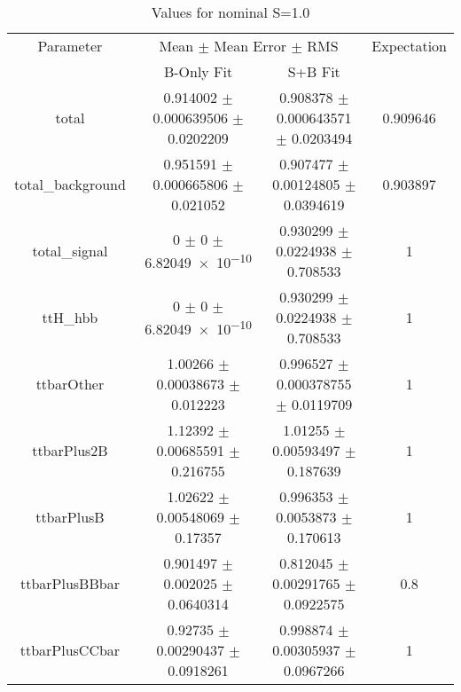 \begin{table}
\centering
\caption{Values for nominal S=1.0}
\begin{tabular}{cccc}
\toprule
Parameter & \multicolumn{2}{c}{Mean $\pm$ Mean Error $\pm$ RMS} & Expectation\\
 & B-Only Fit & S+B Fit & \\
\midrule
total & \num{0.914002} $\pm$ \num{0.000639506} $\pm$ \num{0.0202209} & \num{0.908378} $\pm$ \num{0.000643571} $\pm$ \num{0.0203494} & \num{0.909646}\\
total\_background & \num{0.951591} $\pm$ \num{0.000665806} $\pm$ \num{0.021052} & \num{0.907477} $\pm$ \num{0.00124805} $\pm$ \num{0.0394619} & \num{0.903897}\\
total\_signal & \num{0} $\pm$ \num{0} $\pm$ \num{6.82049e-10} & \num{0.930299} $\pm$ \num{0.0224938} $\pm$ \num{0.708533} & \num{1}\\
ttH\_hbb & \num{0} $\pm$ \num{0} $\pm$ \num{6.82049e-10} & \num{0.930299} $\pm$ \num{0.0224938} $\pm$ \num{0.708533} & \num{1}\\
ttbarOther & \num{1.00266} $\pm$ \num{0.00038673} $\pm$ \num{0.012223} & \num{0.996527} $\pm$ \num{0.000378755} $\pm$ \num{0.0119709} & \num{1}\\
ttbarPlus2B & \num{1.12392} $\pm$ \num{0.00685591} $\pm$ \num{0.216755} & \num{1.01255} $\pm$ \num{0.00593497} $\pm$ \num{0.187639} & \num{1}\\
ttbarPlusB & \num{1.02622} $\pm$ \num{0.00548069} $\pm$ \num{0.17357} & \num{0.996353} $\pm$ \num{0.0053873} $\pm$ \num{0.170613} & \num{1}\\
ttbarPlusBBbar & \num{0.901497} $\pm$ \num{0.002025} $\pm$ \num{0.0640314} & \num{0.812045} $\pm$ \num{0.00291765} $\pm$ \num{0.0922575} & \num{0.8}\\
ttbarPlusCCbar & \num{0.92735} $\pm$ \num{0.00290437} $\pm$ \num{0.0918261} & \num{0.998874} $\pm$ \num{0.00305937} $\pm$ \num{0.0967266} & \num{1}\\
\bottomrule
\end{tabular}
\end{table}